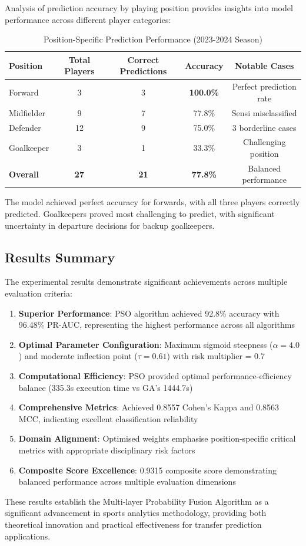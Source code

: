 Analysis of prediction accuracy by playing position provides insights into model performance across different player categories:

\begin{table}[H]
\centering
\caption{Position-Specific Prediction Performance (2023-2024 Season)}
\label{tab:position_specific_2023_2024}
\begin{tabular}{lcccc}
\toprule
\textbf{Position} & \textbf{Total Players} & \textbf{Correct Predictions} & \textbf{Accuracy} & \textbf{Notable Cases} \\
\midrule
Forward & 3 & 3 & \textbf{100.0\%} & Perfect prediction rate \\
Midfielder & 9 & 7 & 77.8\% & Sensi misclassified \\
Defender & 12 & 9 & 75.0\% & 3 borderline cases \\
Goalkeeper & 3 & 1 & 33.3\% & Challenging position \\
\midrule
\textbf{Overall} & \textbf{27} & \textbf{21} & \textbf{77.8\%} & Balanced performance \\
\bottomrule
\end{tabular}
\end{table}

The model achieved perfect accuracy for forwards, with all three players correctly predicted. Goalkeepers proved most challenging to predict, with significant uncertainty in departure decisions for backup goalkeepers.

\subsection{Results Summary}

The experimental results demonstrate significant achievements across multiple evaluation criteria:

\begin{enumerate}
    \item \textbf{Superior Performance}: PSO algorithm achieved 92.8\% accuracy with 96.48\% PR-AUC, representing the highest performance across all algorithms
    \item \textbf{Optimal Parameter Configuration}: Maximum sigmoid steepness ($\alpha = 4.0$) and moderate inflection point ($\tau = 0.61$) with risk multiplier = 0.7
    \item \textbf{Computational Efficiency}: PSO provided optimal performance-efficiency balance (335.3s execution time vs GA's 1444.7s)
    \item \textbf{Comprehensive Metrics}: Achieved 0.8557 Cohen's Kappa and 0.8563 MCC, indicating excellent classification reliability
    \item \textbf{Domain Alignment}: Optimised weights emphasise position-specific critical metrics with appropriate disciplinary risk factors
    \item \textbf{Composite Score Excellence}: 0.9315 composite score demonstrating balanced performance across multiple evaluation dimensions
\end{enumerate}

These results establish the Multi-layer Probability Fusion Algorithm as a significant advancement in sports analytics methodology, providing both theoretical innovation and practical effectiveness for transfer prediction applications.